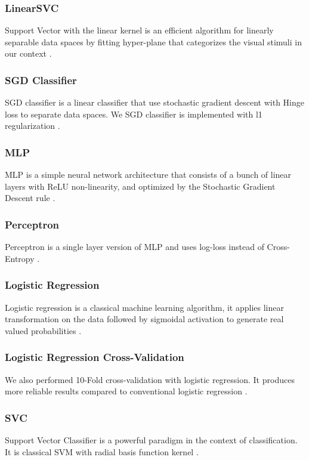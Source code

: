 \documentclass[10pt, twocolumn, letterpaper]{article}
\begin{document}
\subsubsection{LinearSVC}
Support Vector with the linear kernel is an efficient algorithm for linearly separable data spaces by fitting hyper-plane that categorizes the visual stimuli in our context \cite{scikit-learn}. 

\subsubsection{SGD Classifier}
SGD classifier is a linear classifier that use stochastic gradient descent with Hinge loss to separate data spaces. We SGD classifier is implemented with l1 regularization \cite{scikit-learn}. 
\subsubsection{MLP}
MLP is a simple neural network architecture that consists of a bunch of linear layers with ReLU non-linearity, and optimized by the Stochastic Gradient Descent rule \cite{scikit-learn}.

\subsubsection{Perceptron}
Perceptron is a single layer version of MLP and uses log-loss instead of Cross-Entropy \cite{scikit-learn}.

\subsubsection{Logistic Regression}
Logistic regression is a classical machine learning algorithm, it applies linear transformation on the data followed by sigmoidal activation to generate real valued probabilities \cite{scikit-learn}.

\subsubsection{Logistic Regression Cross-Validation}
We also performed 10-Fold cross-validation with logistic regression. It produces more reliable results compared to conventional logistic regression \cite{scikit-learn}. 

\subsubsection{SVC}
Support Vector Classifier is a powerful paradigm in the context of classification. It is classical SVM with radial basis function kernel \cite{scikit-learn}.
\end{document}
